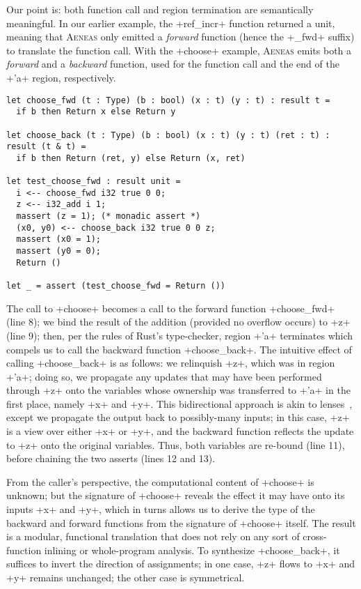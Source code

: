 \documentclass[acmsmall,screen]{acmart}
\newcommand{\aeneas}{\textsc{Aeneas}\xspace}
\begin{document}
Our point is: both function call and region termination are semantically
meaningful. In our earlier example, the \li+ref_incr+ function returned a unit,
meaning that \aeneas only emitted a \emph{forward} function (hence the
\li+_fwd+ suffix) to translate the function call.
With the \li+choose+ example,
\aeneas emits both a \emph{forward} and a \emph{backward} function, used for the
function call and the end of the \li+'a+ region, respectively.
\begin{verbatim}
let choose_fwd (t : Type) (b : bool) (x : t) (y : t) : result t =
  if b then Return x else Return y

let choose_back (t : Type) (b : bool) (x : t) (y : t) (ret : t) : result (t & t) =
  if b then Return (ret, y) else Return (x, ret)

let test_choose_fwd : result unit =
  i <-- choose_fwd i32 true 0 0;
  z <-- i32_add i 1;
  massert (z = 1); (* monadic assert *)
  (x0, y0) <-- choose_back i32 true 0 0 z;
  massert (x0 = 1);
  massert (y0 = 0);
  Return ()

let _ = assert (test_choose_fwd = Return ())
\end{verbatim}
The call to \li+choose+ becomes a call to the forward function \li+choose_fwd+
(line 8); we bind the result of the addition (provided no overflow occurs) to
\li+z+ (line 9); then, per the rules of Rust's type-checker, region
\li+'a+ terminates which compels us to call the backward function \li+choose_back+.
The intuitive effect of calling \li+choose_back+ is as follows: we relinquish
\li+z+, which was in region \li+'a+; doing so, we propagate any updates
that may have been performed through \li+z+ onto the
variables whose ownership was
transferred to \li+'a+ in the first place, namely \li+x+ and \li+y+.
This bidirectional approach is akin to lenses~\cite{bohannon2008boomerang}, except we propagate
the output back to possibly-many inputs; in this case, \li+z+ is a view
over either \li+x+ or \li+y+, and the backward function reflects the update to
\li+z+ onto the original variables.
Thus, both variables are re-bound (line 11),
before chaining the two asserts (lines 12 and 13).

From the caller's perspective, the computational content of \li+choose+ is
unknown; but the signature of \li+choose+ reveals the effect it may have onto its
inputs \li+x+ and \li+y+, which in turns allows us to derive the type of the
backward and forward functions from the signature of \li+choose+ itself.
The result is a modular, functional
translation that does not rely on any sort of cross-function inlining or
whole-program analysis.
To synthesize \li+choose_back+, it suffices to invert the direction
of assignments; in one case, \li+z+ flows to \li+x+ and \li+y+ remains
unchanged; the other case is symmetrical.
\end{document}
